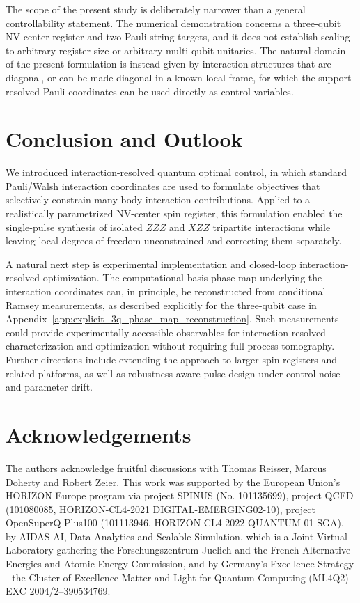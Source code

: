 \noindent
The scope of the present study is deliberately narrower than a general controllability statement. The numerical demonstration concerns a three-qubit NV-center register and two Pauli-string targets, and it does not establish scaling to arbitrary register size or arbitrary multi-qubit unitaries. The natural domain of the present formulation is instead given by interaction structures that are diagonal, or can be made diagonal in a known local frame, for which the support-resolved Pauli coordinates can be used directly as control variables.

\section{Conclusion and Outlook}
\label{sec:conclusion}

\noindent
We introduced interaction-resolved quantum optimal control, in which standard Pauli/Walsh interaction coordinates are used to formulate objectives that selectively constrain many-body interaction contributions. Applied to a realistically parametrized NV-center spin register, this formulation enabled the single-pulse synthesis of isolated $ZZZ$ and $XZZ$ tripartite interactions while leaving local degrees of freedom unconstrained and correcting them separately.

\noindent
A natural next step is experimental implementation and closed-loop interaction-resolved optimization. The computational-basis phase map underlying the interaction coordinates can, in principle, be reconstructed from conditional Ramsey measurements, as described explicitly for the three-qubit case in Appendix~\ref{app:explicit_3q_phase_map_reconstruction}. Such measurements could provide experimentally accessible observables for interaction-resolved characterization and optimization without requiring full process tomography. Further directions include extending the approach to larger spin registers and related platforms, as well as robustness-aware pulse design under control noise and parameter drift.

  



\appendix



\section*{Acknowledgements}
\noindent
The authors acknowledge fruitful discussions with Thomas Reisser, Marcus Doherty and Robert Zeier. This work was supported by the European Union’s HORIZON Europe program via project SPINUS (No. 101135699), project QCFD (101080085, HORIZON-CL4-2021 DIGITAL-EMERGING02-10), project OpenSuperQ-Plus100 (101113946, HORIZON-CL4-2022-QUANTUM-01-SGA), by AIDAS-AI, Data Analytics and Scalable Simulation, which is a Joint Virtual Laboratory gathering the Forschungszentrum Juelich and the French Alternative Energies and Atomic Energy Commission, and by Germany’s Excellence Strategy - the Cluster of Excellence Matter and Light for Quantum Computing (ML4Q2) EXC 2004/2–390534769.\\

